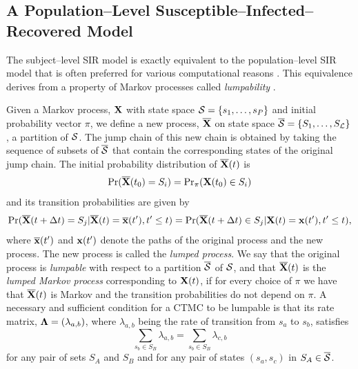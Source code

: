 \subsection{A Population--Level Susceptible--Infected--Recovered Model}
\label{subsec:sir_population_mod}
The subject--level SIR model is exactly equivalent to the population--level SIR model that is often preferred for various computational reasons \cite{andersson2000stochastic,allen2008introduction}. This equivalence derives from a property of Markov processes called \textit{lumpability} \cite{tian2006lumpability}. 

Given a Markov process, $ \mathbf{X} $ with state space $ \mathcal{S} = \lbrace s_1,\dots,s_P\rbrace $ and initial probability vector $ \pi $, we define a new process, $ \overline{\mathbf{X}} $ on state space $ \overline{\mathcal{S}} = \lbrace S_1,\dots,S_\mathcal{L}\rbrace $, a partition of $ \mathcal{S} $. The jump chain of this new chain is obtained by taking the sequence of subsets of $ \overline{\mathcal{S}} $ that contain the corresponding states of the original jump chain. The initial probability distribution of $ \overline{\mathbf{X}}(t) $ is \begin{equation*}
\Pr(\overline{\mathbf{X}}(t_0) = S_i) = \mathrm{Pr}_\pi(\mathbf{X}(t_0) \in S_i)
\end{equation*}
and its transition probabilities are given by
\begin{equation*}
\Pr(\overline{\mathbf{X}}(t+\Delta t) = S_j | \overline{\mathbf{X}}(t)=\overline{\mathbf{x}}(t^\prime), t^\prime \leq t) = \Pr(\overline{\mathbf{X}}(t+\Delta t) \in S_j | \mathbf{X}(t)=\mathbf{x}(t^\prime), t^\prime \leq t),
\end{equation*}
where $ \overline{\mathbf{x}}(t^\prime) $  and $ \mathbf{x}(t^\prime) $ denote the paths of the original process and the new process. The new process is called the \textit{lumped process}. We say that the original process is \textit{lumpable} with respect to a partition $ \overline{\mathcal{S}} $ of $ \mathcal{S} $, and that $ \overline{\mathbf{X}}(t) $ is the \textit{lumped Markov process} corresponding to $ \mathbf{X}(t) $, if for every choice of $ \pi $ we have that $ \overline{\mathbf{X}}(t) $ is Markov and the transition probabilities do not depend on $ \pi $. A necessary and sufficient condition for a CTMC to be lumpable is that its rate matrix, $ \boldsymbol{\Lambda} = (\lambda_{a,b}) $, where $ \lambda_{a,b} $ being the rate of transition from $ s_a $ to $ s_b $, satisfies
\begin{equation*}
\sum_{s_b \in S_B}\lambda_{a,b} = \sum_{s_b \in S_B}\lambda_{c,b}
\end{equation*}
for any pair of sets $S_A$ and $ S_B$ and for any pair of states  $(s_a, s_c)$  in $S_A \in \overline{\mathcal{S}} $. 

